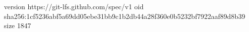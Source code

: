 version https://git-lfs.github.com/spec/v1
oid sha256:1cf5236abf5a69dd05ebe31bb9c1b2db44a28f360e0b5232bf7922aaf89d8b39
size 1847
